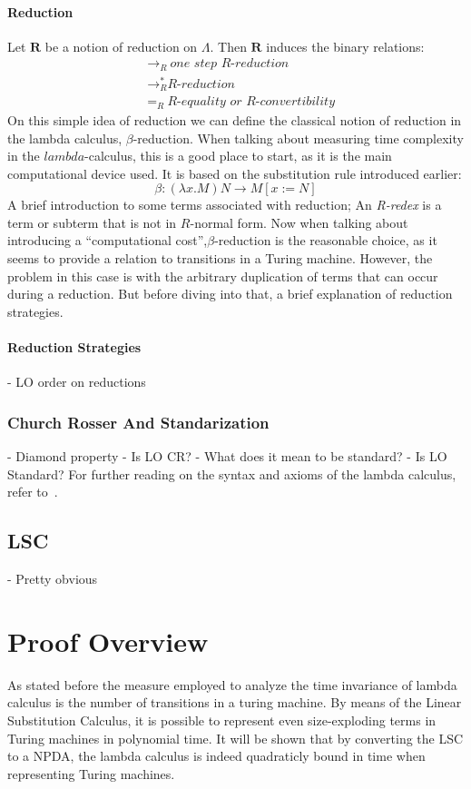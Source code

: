 \documentclass[12pt]{article}
\begin{document}
\paragraph{Reduction} Let $\textbf{R}$ be a notion of reduction on $\Lambda$. Then $\textbf{R}$ induces the binary relations:
\begin{equation}
  \begin{split}
          &{\rightarrow}_{R} \ \textit{one step R-reduction} \\
          &\rightarrow_{R}^{*} \textit{R-reduction} \\
          &=_{R} \ \textit{R-equality or R-convertibility}
  \end{split}
\end{equation}
On this simple idea of reduction we can define the classical notion of reduction in the lambda calculus, $\beta$-reduction. When talking about measuring time complexity in the $lambda$-calculus, this is a good place to start, as it is the main computational device used.
It is based on the substitution rule introduced earlier:
\begin{equation}
  \beta : ( \lambda x.M ) N \rightarrow M [ x:=N ]
\end{equation}
A brief introduction to some terms associated with reduction; An \textit{R-redex} is a term or subterm that is not in $R$-normal form.
Now when talking about introducing a \enquote{computational cost},$\beta$-reduction is the reasonable choice, as it seems to provide a relation to transitions in a Turing machine. However, the problem in this case is with the arbitrary duplication of terms that can occur during a reduction.
But before diving into that, a brief explanation of reduction strategies.
\paragraph{Reduction Strategies}
- LO order on reductions
\subsubsection{Church Rosser And Standarization}
- Diamond property - Is LO CR?
- What does it mean to be standard? - Is LO Standard?
For further reading on the syntax and axioms of the lambda calculus, refer to~\cite{barendregt1984lambda}.
\subsection{LSC}
- Pretty obvious
\section{Proof Overview}
As stated before the measure employed to analyze the time invariance of lambda calculus is the number of transitions in a turing machine. By means of the Linear Substitution Calculus, it is possible to represent even size-exploding terms in Turing machines in polynomial time. It will be shown that by converting the LSC to a NPDA, the lambda calculus is indeed quadraticly bound in time when representing Turing machines.
\end{document}
